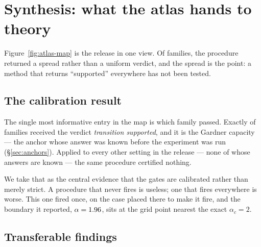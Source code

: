 \section{Synthesis: what the atlas hands to theory}
\label{sec:synthesis}


Figure~\ref{fig:atlas-map} is the release in one view. Of
\AtlasTotalFamilies{} families, the procedure returned a spread rather than a
uniform verdict, and the spread is the point: a method that returns
``supported'' everywhere has not been tested.

\subsection{The calibration result}

The single most informative entry in the map is which family passed. Exactly
\AtlasCountPhaseTransitionSupported{} of \AtlasTotalFamilies{} families
received the verdict \emph{transition supported}, and it is the Gardner
capacity --- the anchor whose answer was known before the experiment was run
(\S\ref{sec:anchors}). Applied to every other setting in the release --- none of whose
answers are known --- the same procedure certified nothing.

We take that as the central evidence that the gates are calibrated rather than
merely strict. A procedure that never fires is useless; one that fires
everywhere is worse. This one fired once, on the case placed there to make it
fire, and the boundary it reported,
$\alpha=1.96{}$, sits at the grid point nearest
the exact $\alpha_c=2$.

\subsection{Transferable findings}

